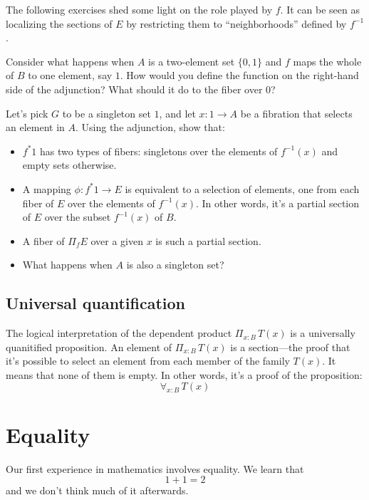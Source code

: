 \documentclass[DaoFP]{subfiles}
\begin{document}
The following exercises shed some light on the role played by $f$. It can be seen as localizing the sections of $E$ by restricting them to ``neighborhoods'' defined by $f^{-1}$.

\begin{exercise}
Consider what happens when $A$ is a two-element set $\{0, 1\}$ and $f$ maps the whole of $B$ to one element, say $1$. How would you define the function on the right-hand side of the adjunction? What should it do to the fiber over $0$?
\end{exercise}

\begin{exercise}
Let's pick $G$ to be a singleton set $1$, and let $x \colon 1 \to A$ be a fibration that selects an element in $A$. Using the adjunction, show that:
\begin{itemize}
\item $f^* 1$ has two types of fibers: singletons over the elements of $f^{-1} (x)$ and empty sets otherwise. 
\item A mapping $\phi \colon f^* 1 \to E$ is equivalent to a selection of elements, one from each fiber of $E$ over the elements of $f^{-1}(x)$. In other words, it's a partial section of $E$ over the subset $f^{-1}(x)$ of $B$.
\item A fiber of $\Pi_f E$ over a given $x$ is such a partial section. 
\item What happens when $A$ is also a singleton set?
\end{itemize}
\end{exercise}



\subsection{Universal quantification}

The logical interpretation of the dependent product $\Pi_{x : B} \, T(x)$ is a universally quanitified proposition. An element of $\Pi_{x : B} \, T(x)$ is a section---the proof that it's possible to select an element from each member of the family $T(x)$. It means that none of them is empty. In other words, it's a proof of the proposition:
\[ \forall_{x : B}\, T(x) \]

\section{Equality}

Our first experience in mathematics involves equality. We learn that 
\[1+1=2\] 
and we don't think much of it afterwards. 
\end{document}
